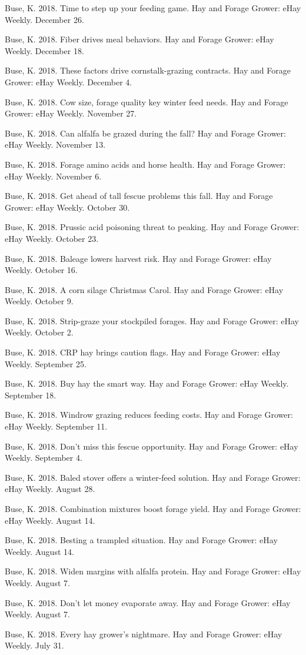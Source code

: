 \documentclass[letterpaper,11pt]{article}
\newcommand{\resumeItem}[1]{
  \item\small{
    {#1 \vspace{-2pt}}
  }
}
\begin{document}
            \resumeItem{Buse, K. 2018. Time to step up your feeding game. Hay and Forage Grower: eHay Weekly. December 26.}
            \resumeItem{Buse, K. 2018. Fiber drives meal behaviors. Hay and Forage Grower: eHay Weekly. December 18.}
            \resumeItem{Buse, K. 2018. These factors drive cornstalk-grazing contracts. Hay and Forage Grower: eHay Weekly. December 4.}
            \resumeItem{Buse, K. 2018. Cow size, forage quality key winter feed needs. Hay and Forage Grower: eHay Weekly. November 27.}
            \resumeItem{Buse, K. 2018. Can alfalfa be grazed during the fall? Hay and Forage Grower: eHay Weekly. November 13.}
            \resumeItem{Buse, K. 2018. Forage amino acids and horse health. Hay and Forage Grower: eHay Weekly. November 6.}
            \resumeItem{Buse, K. 2018. Get ahead of tall fescue problems this fall. Hay and Forage Grower: eHay Weekly. October 30.}
            \resumeItem{Buse, K. 2018. Prussic acid poisoning threat to peaking. Hay and Forage Grower: eHay Weekly. October 23.}
            \resumeItem{Buse, K. 2018. Baleage lowers harvest risk. Hay and Forage Grower: eHay Weekly. October 16.}
            \resumeItem{Buse, K. 2018. A corn silage Christmas Carol. Hay and Forage Grower: eHay Weekly. October 9.}
            \resumeItem{Buse, K. 2018. Strip-graze your stockpiled forages. Hay and Forage Grower: eHay Weekly. October 2.}
            \resumeItem{Buse, K. 2018. CRP hay brings caution flags. Hay and Forage Grower: eHay Weekly. September 25.}
            \resumeItem{Buse, K. 2018. Buy hay the smart way. Hay and Forage Grower: eHay Weekly. September 18.}
            \resumeItem{Buse, K. 2018. Windrow grazing reduces feeding costs. Hay and Forage Grower: eHay Weekly. September 11.}
            \resumeItem{Buse, K. 2018. Don’t miss this fescue opportunity. Hay and Forage Grower: eHay Weekly. September 4.}
            \resumeItem{Buse, K. 2018. Baled stover offers a winter-feed solution. Hay and Forage Grower: eHay Weekly. August 28.}
            \resumeItem{Buse, K. 2018. Combination mixtures boost forage yield. Hay and Forage Grower: eHay Weekly. August 14.}
            \resumeItem{Buse, K. 2018. Besting a trampled situation. Hay and Forage Grower: eHay Weekly. August 14.}
            \resumeItem{Buse, K. 2018. Widen margins with alfalfa protein. Hay and Forage Grower: eHay Weekly. August 7.}
            \resumeItem{Buse, K. 2018. Don’t let money evaporate away. Hay and Forage Grower: eHay Weekly. August 7.}
            \resumeItem{Buse, K. 2018. Every hay grower’s nightmare. Hay and Forage Grower: eHay Weekly. July 31.}
\end{document}
